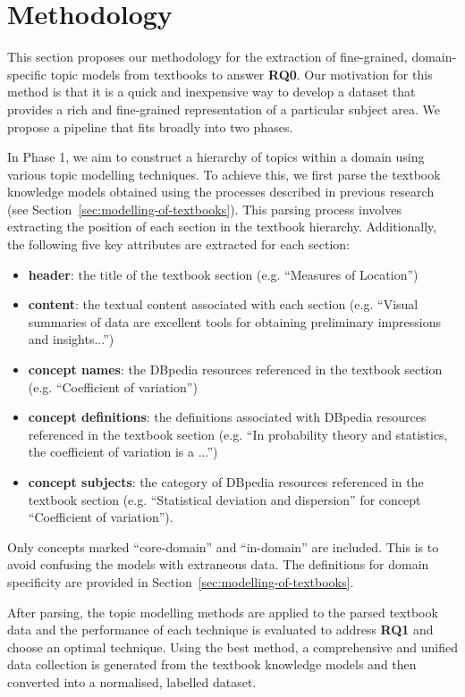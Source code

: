 \documentclass[twocolumn]{article}
\begin{document}
\section{Methodology} \label{sec:methodology}

This section proposes our methodology for the extraction of fine-grained, domain-specific topic models from textbooks to answer \textbf{RQ0}. Our motivation for this method is that it is a quick and inexpensive way to develop a dataset that provides a rich and fine-grained representation of a particular subject area. We propose a pipeline that fits broadly into two phases.

In Phase 1, we aim to construct a hierarchy of topics within a domain using various topic modelling techniques. To achieve this, we first parse the textbook knowledge models obtained using the processes described in previous research (see Section~\ref{sec:modelling-of-textbooks}). This parsing process involves extracting the position of each section in the textbook hierarchy. Additionally, the following five key attributes are extracted for each section:
\begin{itemize}\itemsep-0.2em
    \item \textbf{header}: the title of the textbook section (e.g. ``Measures of Location'')
    \item \textbf{content}: the textual content associated with each section (e.g. ``Visual summaries of data are excellent tools for obtaining preliminary impressions and insights...'') 
    \item \textbf{concept names}: the DBpedia resources referenced in the textbook section (e.g. ``Coefficient of variation'')
    \item \textbf{concept definitions}: the definitions associated with DBpedia resources referenced in the textbook section (e.g. ``In probability theory and statistics, the coefficient of variation is a ...'')
    \item \textbf{concept subjects}: the category of DBpedia resources referenced in the textbook section (e.g. ``Statistical deviation and dispersion'' for concept ``Coefficient of variation'').
\end{itemize}
Only concepts marked ``core-domain'' and ``in-domain'' are included. This is to avoid confusing the models with extraneous data. The definitions for domain specificity are provided in Section~\ref{sec:modelling-of-textbooks}.

After parsing, the topic modelling methods are applied to the parsed textbook data and the performance of each technique is evaluated to address \textbf{RQ1} and choose an optimal technique. Using the best method, a comprehensive and unified data collection is generated from the textbook knowledge models and then converted into a normalised, labelled dataset.
\end{document}
